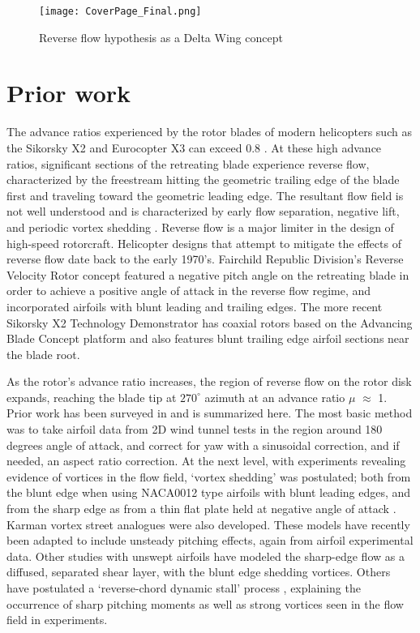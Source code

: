 \documentclass[%
 reprint,
 showkeys,
 amsmath,amssymb,
 aps,
]{revtex4-1}
\begin{document}
\begin{figure}[!t]
\center
\texttt{[image: CoverPage\_Final.png]}
\caption{Reverse flow hypothesis as a Delta Wing concept}
\label{CoverPage_Final}
\end{figure}

\section{Prior work}
The advance ratios experienced by the rotor blades of modern helicopters such as the Sikorsky X2 and Eurocopter X3 can exceed 0.8 \cite{5WalshAHS-2011, 6DattaJAHS-2013}.  At these high advance ratios, significant sections of the retreating blade experience reverse flow, characterized by the freestream hitting the geometric trailing edge of the blade first and traveling toward the geometric leading edge. The resultant flow field is not well understood and is characterized by early flow separation, negative lift, and periodic vortex shedding \cite{7LindAIAA-2013}. Reverse flow is a major limiter in the design of high-speed rotorcraft. Helicopter designs that attempt to mitigate the effects of reverse flow date back to the early 1970’s. Fairchild Republic Division’s Reverse Velocity Rotor \cite{8EwansDTIC-1973} concept featured a negative pitch angle on the retreating blade in order to achieve a positive angle of attack in the reverse flow regime, and incorporated airfoils with blunt leading and trailing edges. The more recent Sikorsky X2 Technology Demonstrator \cite{9BagaiAHS-2008} has coaxial rotors based on the Advancing Blade Concept \cite{10RuddellDTIC-1981} platform and also features blunt trailing edge airfoil sections near the blade root. 

As the rotor's advance ratio increases, the region of reverse flow on the rotor disk expands, reaching the blade tip at $270^\circ$ azimuth at an advance ratio $\mu$ $\approx$ 1. Prior work has been surveyed in \cite{2HiremathAHS-2015} and is summarized here. The most basic method was to take airfoil data \cite{7LindAIAA-2013,11Knight-1929,12CritzosNACA1955,13JacobsNACA-1937,14Bradley-1956} from 2D wind tunnel tests in the region around 180 degrees angle of attack, and correct for yaw with a sinusoidal correction, and if needed, an aspect ratio correction. At the next level, with experiments revealing evidence of vortices in the flow field, `vortex shedding’ was postulated; both from the blunt edge when using NACA0012 type airfoils with blunt leading edges, and from the sharp edge as from a thin flat plate held at negative angle of attack \cite{7LindAIAA-2013}. Karman vortex street analogues were also developed. These models have recently been adapted to include unsteady pitching effects, again from airfoil experimental data. Other studies with unswept airfoils have modeled the sharp-edge flow as a diffused, separated shear layer, with the blunt edge shedding vortices. Others have postulated a `reverse-chord dynamic stall’ process \cite{6DattaJAHS-2013}, explaining the occurrence of sharp pitching moments as well as strong vortices seen in the flow field in experiments. 
\end{document}
